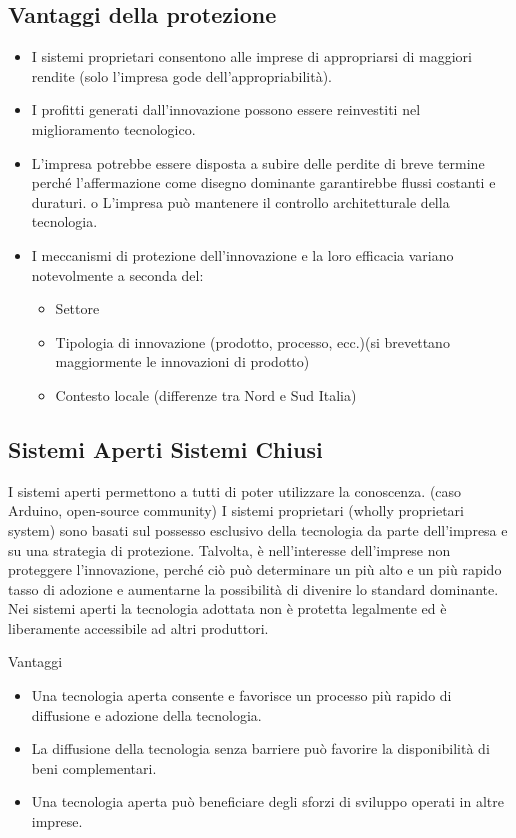 \documentclass{article}
\begin{document}
\subsection{Vantaggi della protezione}
\begin{itemize}
	\item   I sistemi proprietari consentono alle imprese di appropriarsi di maggiori rendite (solo
	l’impresa gode dell’appropriabilità).
	\item I profitti generati dall’innovazione possono essere reinvestiti nel miglioramento
	tecnologico.
	\item L’impresa potrebbe essere disposta a subire delle perdite di breve termine perché
	l’affermazione come disegno dominante garantirebbe flussi costanti e duraturi.
	o L’impresa può mantenere il controllo architetturale della tecnologia.
	\item I meccanismi di protezione dell’innovazione e la loro efficacia variano notevolmente a seconda del:
	\begin{itemize}
		\item Settore
		\item Tipologia di innovazione (prodotto, processo, ecc.)(si brevettano maggiormente le
		innovazioni di prodotto)
		\item  Contesto locale (differenze tra Nord e Sud Italia)
	\end{itemize}
\end{itemize}

\subsection{Sistemi Aperti Sistemi Chiusi}
I sistemi aperti permettono a tutti di poter utilizzare la conoscenza.
(caso Arduino, open-source community)
I sistemi proprietari (wholly proprietari system) sono basati sul possesso esclusivo della tecnologia
da parte dell’impresa e su una strategia di protezione.
Talvolta, è nell’interesse dell’imprese non proteggere l’innovazione, perché ciò può determinare
un più alto e un più rapido tasso di adozione e aumentarne la possibilità di divenire lo standard
dominante.
Nei sistemi aperti la tecnologia adottata non è protetta legalmente ed è liberamente accessibile ad
altri produttori.

Vantaggi
\begin{itemize}
	\item Una tecnologia aperta consente e favorisce un processo più rapido di diffusione e adozione
	della tecnologia.
	\item La diffusione della tecnologia senza barriere può favorire la disponibilità di beni
	complementari.
	\item Una tecnologia aperta può beneficiare degli sforzi di sviluppo operati in altre imprese.
\end{itemize}
\end{document}
